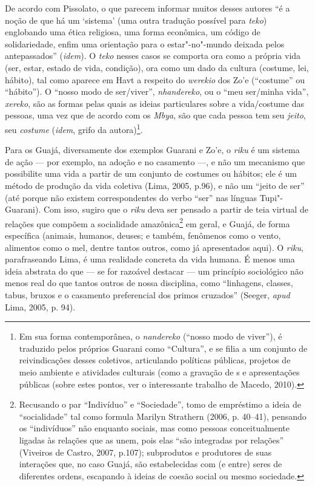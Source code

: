 De acordo com Pissolato, o que parecem informar muitos desses autores ``é
a noção de que há um `sistema' (uma outra tradução possível para
\emph{teko}) englobando uma ética religiosa, uma forma econômica, um
código de solidariedade, enfim uma orientação para o estar"-no"-mundo
deixada pelos antepassados'' (\emph{idem}). O \emph{teko} nesses casos se
comporta ora como a própria vida (ser, estar, estado de vida, condição),
ora como um dado da cultura (costume, lei, hábito), tal como aparece em
Havt a respeito do \emph{werekio} dos Zo'e (``costume'' ou ``hábito''). O
``nosso modo de ser/viver'', \emph{nhandereko}, ou o ``meu ser/minha vida'',
\emph{xereko}, são as formas pelas quais as ideias particulares sobre a
vida/costume das pessoas, uma vez que de acordo com os \emph{Mbya}, são
que cada pessoa tem seu \emph{jeito}, seu \emph{costume} (\emph{idem}, grifo da
autora)\footnote{Em sua forma contemporânea, o \emph{nandereko} (``nosso
  modo de viver''), é traduzido pelos próprios Guarani como ``Cultura'', e
  se filia a um conjunto de reivindicações desses coletivos, articulando
  políticas públicas, projetos de meio ambiente e atividades culturais
  (como a gravação de s e apresentações públicas (sobre estes pontos,
  ver o interessante trabalho de Macedo, 2010).}.

Para os Guajá, diversamente dos exemplos Guarani e Zo'e, o \emph{riku} é
um sistema de ação --- por exemplo, na adoção e no casamento ---, e não um
mecanismo que possibilite uma vida a partir de um conjunto de costumes
ou hábitos; ele é um método de produção da vida coletiva (Lima, 2005,
p.96), e não um ``jeito de ser'' (até porque não existem correspondentes
do verbo ``ser'' nas línguas Tupi"-Guarani). Com isso, sugiro que o
\emph{riku} deva ser pensado a partir de teia virtual de relações que
compõem a socialidade amazônica\footnote{Recusando o par ``Indivíduo'' e
  ``Sociedade'', tomo de empréstimo a ideia de ``socialidade'' tal como
  formula Marilyn Strathern (2006, p. 40--41), pensando os ``indivíduos''
  não enquanto sociais, mas como pessoas conceitualmente ligadas às
  relações que as unem, pois elas ``são integradas por relações''
  (Viveiros de Castro, 2007, p.107); subprodutos e produtores de suas
  interações que, no caso Guajá, são estabelecidas com (e entre) seres
  de diferentes ordens, escapando à ideias de coesão social ou mesmo
  sociedade.} em geral, e Guajá, de forma específica (animais, humanos,
deuses; e também, fenômenos como o vento, alimentos como o mel, dentre
tantos outros, como já apresentados aqui). O \emph{riku}, parafraseando
Lima, é uma realidade concreta da vida humana. É menos uma ideia
abstrata do que --- se for razoável destacar --- um princípio sociológico
não menos real do que tantos outros de nossa disciplina, como
``linhagens, classes, tabus, bruxos e o casamento preferencial dos primos
cruzados'' (Seeger, \emph{apud} Lima, 2005, p. 94).

